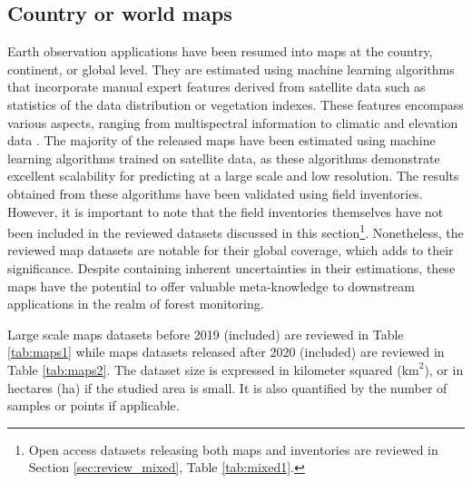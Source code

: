 \documentclass{CUP-JNL-DTM}%
\theoremstyle{definition}
\numberwithin{equation}{section}
\begin{document}
\subsection{Country or world maps}
\label{sec:review_maps}


Earth observation applications have been resumed into maps at the country, continent, or global level. They are estimated using machine learning algorithms that incorporate manual expert features derived from satellite data such as statistics of the data distribution or vegetation indexes. These features encompass various aspects, ranging from multispectral information \cite{friedl_modis_2010, pflugmacher_mapping_2019} to climatic and elevation data \cite{chaves_mapping_2020}.
%
%
%
The majority of the released maps have been estimated using machine learning algorithms trained on satellite data, as these algorithms demonstrate excellent scalability for predicting at a large scale and low resolution.
The results obtained from these algorithms have been validated using field inventories. However, it is important to note that the field inventories themselves have not been included in the reviewed datasets discussed in this section\footnote{Open access datasets releasing both maps and inventories are reviewed in Section \ref{sec:review_mixed}, Table \ref{tab:mixed1}.}. 
Nonetheless, the reviewed map datasets are notable for their global coverage, which adds to their significance.
Despite containing inherent uncertainties in their estimations, these maps have the potential to offer valuable meta-knowledge to downstream applications in the realm of forest monitoring.


Large scale maps datasets before 2019 (included) are reviewed in Table \ref{tab:maps1} while maps datasets released after 2020 (included) are reviewed in Table \ref{tab:maps2}.
The dataset size is expressed in kilometer squared ($\text{km}^2$), or in hectares (ha) if the studied area is small. It is also quantified by the number of samples or points if applicable.
\end{document}
